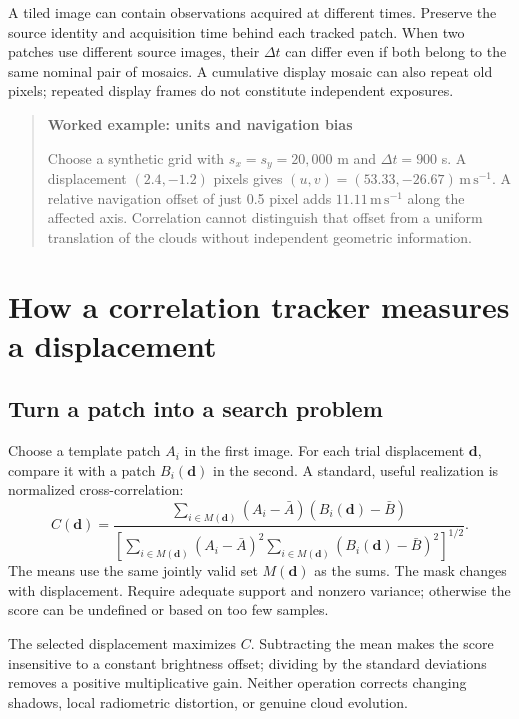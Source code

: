 \documentclass[11pt]{article}
\newcommand{\disp}{\bm{d}}
\newcommand{\ms}{\mathrm{m\,s^{-1}}}
\newenvironment{teaching}[1]{\begin{quote}\small\textbf{#1}\par}{\end{quote}}
\begin{document}
A tiled image can contain observations acquired at different times. Preserve
the source identity and acquisition time behind each tracked patch. When
two patches use different source images, their $\Delta t$ can differ even if
both belong to the same nominal pair of mosaics. A cumulative display
mosaic can also repeat old pixels; repeated display frames do not constitute
independent exposures.

\begin{teaching}{Worked example: units and navigation bias}
Choose a synthetic grid with $s_x=s_y=20{,}000$ m and $\Delta t=900$ s.
A displacement $(2.4,-1.2)$ pixels gives
$(u,v)=(53.33,-26.67)\,\ms$. A relative navigation offset of just 0.5 pixel
adds $11.11\,\ms$ along the affected axis. Correlation cannot distinguish
that offset from a uniform translation of the clouds without independent
geometric information.
\end{teaching}

\section{How a correlation tracker measures a displacement}

\subsection{Turn a patch into a search problem}

Choose a template patch $A_i$ in the first image. For each trial displacement
$\disp$, compare it with a patch $B_i(\disp)$ in the second. A standard,
useful realization is normalized cross-correlation:
\begin{equation}\label{eq:ncc}
 C(\disp)=
 \frac{\sum_{i\in M(\disp)}(A_i-\bar A)(B_i(\disp)-\bar B)}
 {\left[\sum_{i\in M(\disp)}(A_i-\bar A)^2
 \sum_{i\in M(\disp)}(B_i(\disp)-\bar B)^2\right]^{1/2}}.
\end{equation}
The means use the same jointly valid set $M(\disp)$ as the sums. The mask
changes with displacement. Require adequate support and nonzero variance;
otherwise the score can be undefined or based on too few samples.

The selected displacement maximizes $C$. Subtracting the mean makes the
score insensitive to a constant brightness offset; dividing by the standard
deviations removes a positive multiplicative gain. Neither operation corrects
changing shadows, local radiometric distortion, or genuine cloud evolution.
\end{document}
